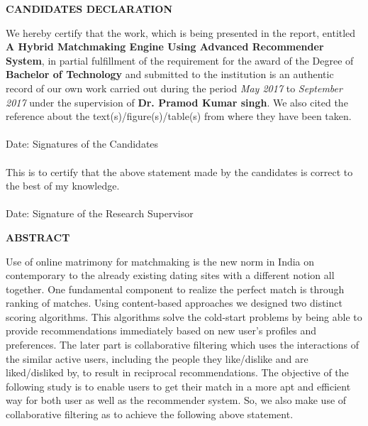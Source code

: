 \documentclass[12pt,oneside]{book}
\begin{document}
\setcounter{page}{1}
\newpage
\begin{center}
{\large \bf CANDIDATES DECLARATION}
\end{center}
We hereby certify that the work, which is being presented in the report, entitled {\bf A Hybrid Matchmaking Engine Using Advanced Recommender System}, 
in partial fulfillment of the requirement for the award of the
Degree of {\bf Bachelor of Technology} and submitted to the institution is an authentic record of our own work carried out
during the period \emph{May 2017} to \emph{September 2017} under the supervision of {\bf Dr. Pramod Kumar singh}. We also cited the reference about the text(s)/figure(s)/table(s) from where they have been taken.\\
\vspace{0.6in} \\
Date: \hspace{3.4in} Signatures of the Candidates \\
\vspace{0.2in} \\
This is to certify that the above statement made by the candidates is correct to the best of my knowledge. \\
\vspace{0.5in} \\
Date: \hspace{2.65in} Signature of the Research Supervisor \\
\newpage
{}
\begin{center}
{\large \bf ABSTRACT}
\end{center}
Use of online matrimony for matchmaking is the new norm in India on contemporary to the already existing dating sites with a different notion all together. One fundamental component to realize the perfect match is through ranking of matches. Using content-based approaches we designed two distinct scoring algorithms. This algorithms solve the cold-start problems by being able to provide recommendations immediately based on new user's profiles and preferences. The later part is collaborative filtering which uses the interactions of the similar active users, including the people they like/dislike and are liked/disliked by, to result in reciprocal recommendations. The objective of the following study is to enable users to get their match in a more apt and efficient way for both user as well as the recommender system. So, we also make use of collaborative filtering as to achieve the following above statement. \\
\end{document}
